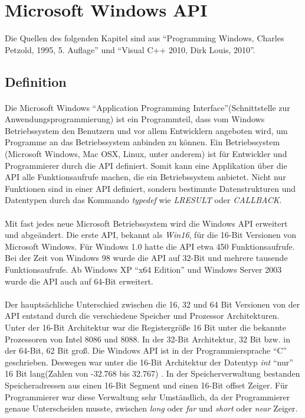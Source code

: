 \section{Microsoft Windows API}

Die Quellen des folgenden Kapitel sind aus "`Programming Windows, Charles Petzold, 1995, 5. Auflage"' und "`Visual C++ 2010, Dirk Louis, 2010"'.

\subsection{Definition}

\paragraph{}
Die Microsoft Windows "`Application Programming Interface"'(Schnittstelle zur Anwendungsprogrammierung) ist ein Programmteil, dass vom Windows Betriebssystem den Benutzern und vor allem Entwicklern angeboten wird, um Programme an das Betriebssystem anbinden zu können. Ein Betriebssystem (Microsoft Windows, Mac OSX, Linux, unter anderem) ist für Entwickler und Programmierer durch die API definiert. Somit kann eine Applikation über die API alle Funktionsaufrufe machen, die ein Betriebssystem anbietet. Nicht nur Funktionen sind in einer API definiert, sondern bestimmte Datenstrukturen und Datentypen durch das Kommando \textit{typedef} wie \textit{LRESULT} oder \textit{CALLBACK}.
\paragraph{}
Mit fast jedes neue Microsoft Betriebssystem wird die Windows API erweitert und abgeändert. Die erste API, bekannt als \textit{Win16}, für die 16-Bit Versionen von Microsoft Windows. Für Windows 1.0 hatte die API etwa 450 Funktionsaufrufe. Bei der Zeit von Windows 98 wurde die API auf 32-Bit und mehrere tausende Funktionsaufrufe. Ab Windows XP "`x64 Edition"' und Windows Server 2003 wurde die API auch auf 64-Bit erweitert.
\paragraph{}
Der hauptsächliche Unterschied zwischen die 16, 32 und 64 Bit Versionen von der API entstand durch die verschiedene Speicher und Prozessor Architekturen. Unter der 16-Bit Architektur war die Registergröße 16 Bit unter die bekannte Prozessoren von Intel 8086 und 8088. In der 32-Bit Architektur, 32 Bit bzw. in der 64-Bit, 62 Bit groß. Die Windows API ist in der Programmiersprache "`C"' geschrieben. Deswegen war unter die 16-Bit Architektur der Datentyp \textit{int} "`nur"' 16 Bit lang(Zahlen von -32.768 bis 32.767) . In der Speicherverwaltung bestanden Speicheradressen aus einen 16-Bit Segment und einen 16-Bit offset Zeiger. Für Programmierer war diese Verwaltung sehr Umständlich, da der Programmierer genaue Unterscheiden musste, zwischen \textit{long} oder \textit{far} und \textit{short} oder \textit{near} Zeiger. 
